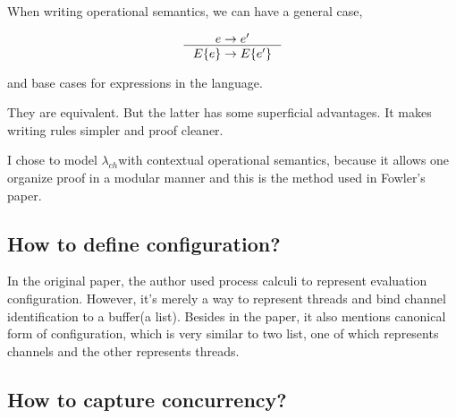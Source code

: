 \documentclass{article}
\newcommand{\lambdach}{$\lambda_{ch}$}
\begin{document}


When writing operational semantics, we can have a general case,

\begin{gather*}
    \inference{
        e -> e'
    }{
        E\{e\} -> E\{e'\}
    }
\end{gather*}

and base cases for expressions in the language.


They are equivalent. But the latter has some superficial advantages. It makes writing rules simpler
and proof cleaner\cite{harper2016practical}.

I chose to model \lambdach with contextual operational semantics, because it allows one organize proof
in a modular manner and this is the method used in Fowler's paper\cite{fowler2019typed}.

\subsection{How to define configuration?}

In the original paper\cite{fowler2019typed}, the author used process calculi to represent evaluation configuration.
However, it's merely a way to represent threads and bind channel identification to a buffer(a list). Besides in the
paper\cite{fowler2019typed}, it also mentions canonical form of configuration, which is very similar to two list, one of which
represents channels and the other represents threads.

\subsection{How to capture concurrency?}
\end{document}
